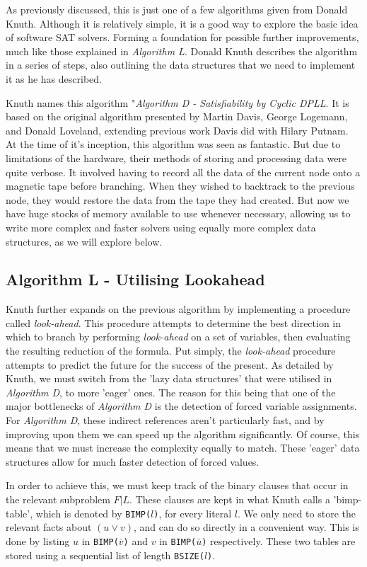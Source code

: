 \documentclass{article}
\begin{document}
As previously discussed, this is just one of a few algorithms given from Donald Knuth. Although it is
relatively simple, it is a good way to explore the basic idea of software SAT solvers. Forming a
foundation for possible further improvements, much like those explained in \textit{Algorithm L}. Donald Knuth
describes the algorithm in a series of steps, also outlining the data structures that we need to
implement it as he has described.

Knuth names this algorithm "\textit{Algorithm D - Satisfiability by Cyclic DPLL}. It is based on the
original algorithm presented by Martin Davis, George Logemann, and Donald Loveland\cite{dpll},
extending previous work Davis did with Hilary Putnam\cite{putnam}. At the time of it's inception, this
algorithm was seen as fantastic. But due to limitations of the hardware, their methods of storing
and processing data were quite verbose. It involved having to record all the data of the current
node onto a magnetic tape before branching. When they wished to backtrack to the previous node,
they would restore the data from the tape they had created. But now we have huge stocks of memory
available to use whenever necessary, allowing us to write more complex and faster solvers using
equally more complex data structures, as we will explore below.

\subsection{Algorithm L - Utilising Lookahead}
Knuth further expands on the previous algorithm by implementing a procedure called \textit{look-ahead}. This procedure attempts to
determine the best direction in which to branch by performing \textit{look-ahead} on a set of variables, then evaluating the
resulting reduction of the formula. Put simply, the \textit{look-ahead} procedure attempts to predict the future for the success
of the present. As detailed by Knuth, we must switch from the 'lazy data structures' that were utilised in \textit{Algorithm D},
to more 'eager' ones. The reason for this being that one of the major bottlenecks of \textit{Algorithm D} is the detection of
forced variable assignments. For \textit{Algorithm D}, these indirect references aren't particularly fast, and by improving upon
them we can speed up the algorithm significantly. Of course, this means that we must increase the complexity equally to match.
These 'eager' data structures allow for much faster detection of forced values. 

In order to achieve this, we must keep track of the binary clauses that occur in the relevant subproblem $F | L$. These clauses
are kept in what Knuth calls a 'bimp-table', which is denoted by \texttt{BIMP($l$)}, for every literal $l$. We only need to store
the relevant facts about $(u \vee v)$, and can do so directly in a convenient way. This is done by listing $u$ in
\texttt{BIMP($\bar{v}$)} and $v$ in \texttt{BIMP($\bar{u}$)} respectively. These two tables are stored using a sequential list of
length \texttt{BSIZE($l$)}.
\end{document}
